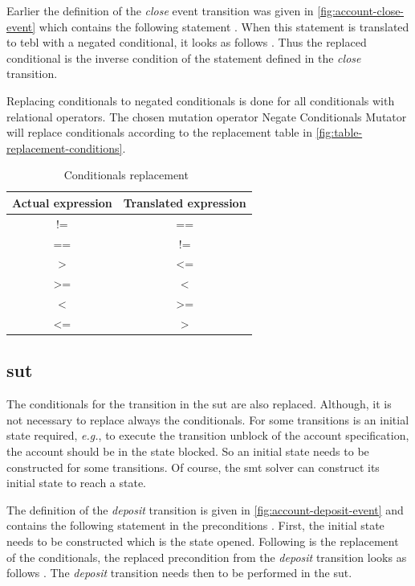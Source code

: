 Earlier the definition of the \textit{close} event transition was given in
\autoref{fig:account-close-event} which contains the following statement
. When this statement is translated to tebl
with a negated conditional, it looks as follows
. Thus the replaced conditional is the inverse
condition of the statement defined in the \textit{close} transition.

Replacing conditionals to negated conditionals is done for all conditionals with
relational operators. The chosen mutation operator Negate Conditionals Mutator
will replace conditionals according to the replacement table in
\autoref{fig:table-replacement-conditions}.

\begin{table}[h!]
\centering
\begin{tabular}{cc}
\toprule
\textbf{Actual expression} & \textbf{Translated expression} \\ \midrule
!=                         & ==                             \\
==                         & !=                             \\
\textgreater               & \textless=                     \\
\textgreater=              & \textless                      \\
\textless                  & \textgreater=                  \\
\textless=                 & \textgreater                   \\ \bottomrule
\end{tabular}
\caption{Conditionals replacement~\cite{pitmutators}}\label{fig:table-replacement-conditions}
\end{table}
\FloatBarrier

\subsection{\gls{sut}}
The conditionals for the transition in the \gls{sut} are also replaced.
Although, it is not necessary to replace always the conditionals. For some
transitions is an initial state required, \textit{e.g.}, to execute the transition unblock
of the account specification, the account should be in the state blocked. So an
initial state needs to be constructed for some transitions. Of course, the \gls{smt}
solver can construct its initial state to reach a state.

The definition of the \textit{deposit} transition is given in
\autoref{fig:account-deposit-event} and contains the following statement in the
preconditions . First, the initial state needs to be
constructed which is the state opened. Following is the replacement of the conditionals, the
replaced precondition from the \textit{deposit} transition looks as follows
. The \textit{deposit} transition needs then to be
performed in the \gls{sut}.

